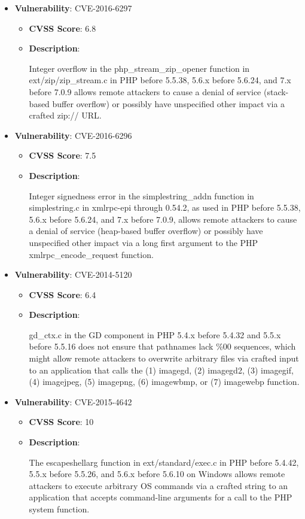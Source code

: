 \documentclass{article}
\begin{document}
\begin{itemize}
        \item \textbf{Vulnerability}: CVE-2016-6297
        \begin{itemize}
            \item \textbf{CVSS Score}:  6.8 
            \item \textbf{Description}:
            \parbox[t]{0.9\linewidth}{
                \ttfamily Integer overflow in the php\_stream\_zip\_opener function in ext/zip/zip\_stream.c in PHP before 5.5.38, 5.6.x before 5.6.24, and 7.x before 7.0.9 allows remote attackers to cause a denial of service (stack-based buffer overflow) or possibly have unspecified other impact via a crafted zip:// URL.
            }
        \end{itemize}
    
        \item \textbf{Vulnerability}: CVE-2016-6296
        \begin{itemize}
            \item \textbf{CVSS Score}:  7.5 
            \item \textbf{Description}:
            \parbox[t]{0.9\linewidth}{
                \ttfamily Integer signedness error in the simplestring\_addn function in simplestring.c in xmlrpc-epi through 0.54.2, as used in PHP before 5.5.38, 5.6.x before 5.6.24, and 7.x before 7.0.9, allows remote attackers to cause a denial of service (heap-based buffer overflow) or possibly have unspecified other impact via a long first argument to the PHP xmlrpc\_encode\_request function.
            }
        \end{itemize}
    
        \item \textbf{Vulnerability}: CVE-2014-5120
        \begin{itemize}
            \item \textbf{CVSS Score}:  6.4 
            \item \textbf{Description}:
            \parbox[t]{0.9\linewidth}{
                \ttfamily gd\_ctx.c in the GD component in PHP 5.4.x before 5.4.32 and 5.5.x before 5.5.16 does not ensure that pathnames lack \%00 sequences, which might allow remote attackers to overwrite arbitrary files via crafted input to an application that calls the (1) imagegd, (2) imagegd2, (3) imagegif, (4) imagejpeg, (5) imagepng, (6) imagewbmp, or (7) imagewebp function.
            }
        \end{itemize}
    
        \item \textbf{Vulnerability}: CVE-2015-4642
        \begin{itemize}
            \item \textbf{CVSS Score}:  10 
            \item \textbf{Description}:
            \parbox[t]{0.9\linewidth}{
                \ttfamily The escapeshellarg function in ext/standard/exec.c in PHP before 5.4.42, 5.5.x before 5.5.26, and 5.6.x before 5.6.10 on Windows allows remote attackers to execute arbitrary OS commands via a crafted string to an application that accepts command-line arguments for a call to the PHP system function.
            }
        \end{itemize}
    

\end{itemize}
\end{document}
